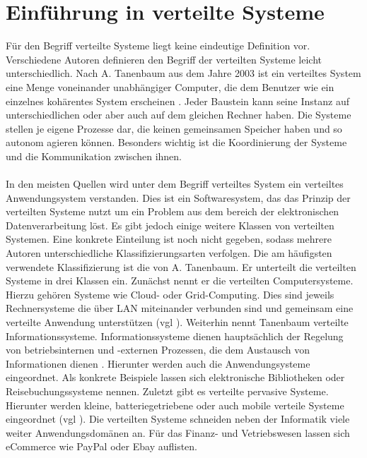 \section{Einführung in verteilte Systeme}\label{EinfuerungInVerteilteSysteme}

Für den Begriff \glqq verteilte Systeme \grqq{} liegt keine eindeutige Definition vor. Verschiedene Autoren definieren den Begriff der verteilten Systeme leicht unterschiedlich.
Nach A. Tanenbaum aus dem Jahre 2003 ist ein verteiltes System eine Menge voneinander unabhängiger Computer, die dem Benutzer wie ein einzelnes kohärentes System
erscheinen \cite{Mandl.2009}. Jeder Baustein kann seine Instanz auf unterschiedlichen oder aber auch auf dem gleichen Rechner haben. Die Systeme stellen je eigene Prozesse dar,
 die keinen gemeinsamen
Speicher haben und so autonom agieren können. Besonders wichtig ist die Koordinierung der Systeme und die Kommunikation zwischen ihnen.
\\\\
In den meisten Quellen wird unter dem Begriff verteiltes System ein verteiltes Anwendungsystem verstanden. Dies ist ein Softwaresystem, das das Prinzip der verteilten Systeme 
nutzt um ein 
Problem aus dem bereich der elektronischen Datenverarbeitung löst. Es gibt jedoch einige weitere Klassen von verteilten Systemen. Eine konkrete Einteilung ist noch nicht gegeben, sodass
mehrere Autoren unterschiedliche Klassifizierungsarten verfolgen. Die am häufigsten verwendete Klassifizierung ist die von A. Tanenbaum. Er unterteilt die verteilten Systeme
in drei Klassen ein. Zunächst nennt er die verteilten Computersysteme. Hierzu gehören Systeme wie Cloud- oder Grid-Computing. Dies sind jeweils Rechnersysteme die über LAN miteinander verbunden
sind und gemeinsam eine verteilte Anwendung unterstützen (vgl \cite{Mandl.2009}). Weiterhin nennt Tanenbaum verteilte Informationssysteme.
Informationssysteme dienen hauptsächlich der Regelung von betriebsinternen und -externen Prozessen, die dem Austausch von Informationen dienen \cite{Lackes.o.J.}. 
Hierunter werden auch die Anwendungsysteme eingeordnet. Als konkrete Beispiele lassen sich elektronische Bibliotheken oder Reisebuchungssysteme nennen.
Zuletzt gibt es verteilte pervasive Systeme. Hierunter werden kleine, batteriegetriebene oder auch mobile verteile Systeme eingeordnet (vgl \cite{Mandl.2009}).
\newline
Die verteilten Systeme schneiden neben der Informatik viele weiter Anwendungsdomänen an. Für das Finanz- und Vetriebswesen lassen sich eCommerce wie PayPal oder Ebay auflisten. 
